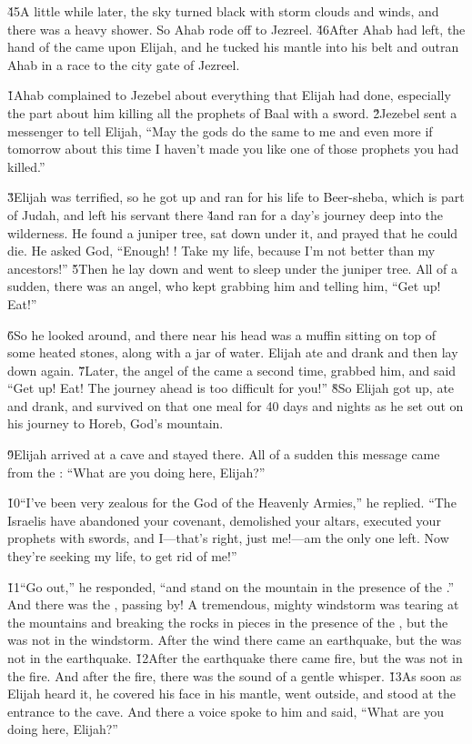 \v{45}A little while later, the sky turned black with storm clouds and winds, and there was a heavy shower. So Ahab rode off to Jezreel. \v{46}After Ahab had left, the hand of the  came upon Elijah, and he tucked his mantle into his belt and outran Ahab in a race to the city gate of Jezreel.

\v{1}Ahab complained to Jezebel about everything that Elijah had done, especially the part about him killing all the prophets of Baal with a sword. \v{2}Jezebel sent a messenger to tell Elijah, ``May the gods do the same to me and even more if tomorrow about this time I haven't made you like one of those prophets you had killed.''

\v{3}Elijah was terrified, so he got up and ran for his life to Beer-sheba, which is part of Judah, and left his servant there \v{4}and ran for a day's journey deep into the wilderness. He found a juniper tree, sat down under it, and prayed that he could die. He asked God, ``Enough! ! Take my life, because I'm not better than my ancestors!'' \v{5}Then he lay down and went to sleep under the juniper tree. All of a sudden, there was an angel, who kept grabbing him and telling him, ``Get up! Eat!''

\v{6}So he looked around, and there near his head was a muffin sitting on top of some heated stones, along with a jar of water. Elijah ate and drank and then lay down again. \v{7}Later, the angel of the  came a second time, grabbed him, and said ``Get up! Eat! The journey ahead is too difficult for you!'' \v{8}So Elijah got up, ate and drank, and survived on that one meal for 40 days and nights as he set out on his journey to Horeb, God's mountain.

\v{9}Elijah arrived at a cave and stayed there. All of a sudden this message came from the : ``What are you doing here, Elijah?''

\v{10}``I've been very zealous for the  God of the Heavenly Armies,'' he replied. ``The Israelis have abandoned your covenant, demolished your altars, executed your prophets with swords, and I---that's right, just me!---am the only one left. Now they're seeking my life, to get rid of me!''

\v{11}``Go out,'' he responded, ``and stand on the mountain in the presence of the .'' And there was the , passing by! A tremendous, mighty windstorm was tearing at the mountains and breaking the rocks in pieces in the presence of the , but the  was not in the windstorm. After the wind there came an earthquake, but the  was not in the earthquake. \v{12}After the earthquake there came fire, but the  was not in the fire. And after the fire, there was the sound of a gentle whisper. \v{13}As soon as Elijah heard it, he covered his face in his mantle, went outside, and stood at the entrance to the cave. And there a voice spoke to him and said, ``What are you doing here, Elijah?''


